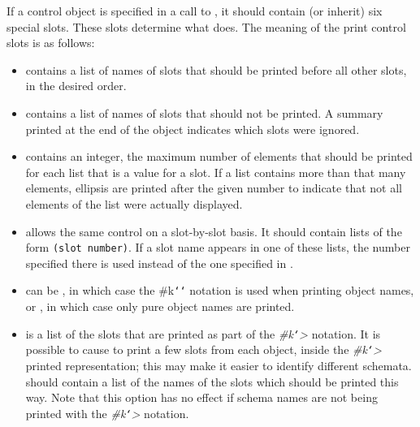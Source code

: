 If a control object is specified in a call to , it should contain (or
inherit) six special slots.  These slots determine what  does.  The
meaning of the print control slots is as follows:

\begin{itemize}
\item {} contains a list of names
of slots that should be printed before all other slots, in the desired
order.

\item {} contains a list of names of
slots that should not be printed.  A summary printed at the end of the
object indicates which slots were ignored.

\item {} contains an
integer, the maximum number of elements that should be printed for each list
that is a value for a slot.
If a list contains more than that many elements, ellipsis are printed after
the given number to indicate that not all elements of the list were actually
displayed.

\item {} allows the same control on a
slot-by-slot basis.  It should contain lists of the form {\tt (slot number)}.
If a slot name appears in one of these lists, the number specified there is
used instead of the one specified in .

\item {} can be \value{t},
in which case the \#k{\tt\char`\<}{\tt\char`\>} notation is used when printing object names, or
\value{nil}, in which case only pure object names are printed.

\item {} is a list of the slots that are
printed as part of the {\it \#k{\tt\char`\<}>} notation.  It is possible to cause 
to print a few slots from each object, inside the {\it \#k{\tt\char`\<}>} printed
representation; this may make it easier to identify different schemata.
 should contain a list of the names of the slots which
should be printed this way.  Note that this option has no effect if schema
names are not being printed with the {\it \#k{\tt\char`\<}>} notation.
\end{itemize}



